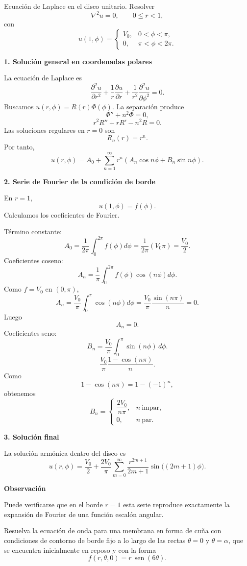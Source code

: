 \documentclass[11pt,spanish]{article}
\newcounter{problema}
\newcommand{\prob}{\stepcounter{problema} \vspace{.5cm} \noindent{\bf Problema \arabic{problema}: }}
\begin{document}
Ecuación de Laplace en el disco unitario.
Resolver
$$
\nabla^2u=0,
\qquad 0\le r<1,
$$
con
$$
u(1,\phi)=
\begin{cases}
V_0,&0<\phi<\pi,\\
0,&\pi<\phi<2\pi.
\end{cases}
$$

{\bf 1. Solución general en coordenadas polares}

La ecuación de Laplace es
$$
\frac{\partial^2u}{\partial r^2}
+\frac1r\frac{\partial u}{\partial r}
+\frac1{r^2}\frac{\partial^2u}{\partial\phi^2}=0.
$$
Buscamos $u(r,\phi)=R(r)\Phi(\phi)$.
La separación produce
$$
\Phi''+n^2\Phi=0,
$$
$$
r^2R''+rR'-n^2R=0.
$$
Las soluciones regulares en $r=0$ son
$$
R_n(r)=r^n.
$$
Por tanto,
$$
u(r,\phi)
=
A_0
+\sum_{n=1}^{\infty}
r^n
\left(
A_n\cos n\phi
+
B_n\sin n\phi
\right).
$$

{\bf 2. Serie de Fourier de la condición de borde}

En $r=1$,
$$
u(1,\phi)=f(\phi).
$$
Calculamos los coeficientes de Fourier.

Término constante:
$$
A_0
=
\frac1{2\pi}
\int_0^{2\pi}f(\phi)d\phi
=
\frac1{2\pi}(V_0\pi)
=
\frac{V_0}{2}.
$$
Coeficientes coseno:
$$
A_n
=
\frac1\pi
\int_0^{2\pi}
f(\phi)\cos(n\phi)d\phi.
$$
Como $f=V_0$ en $(0,\pi)$,
$$
A_n
=
\frac{V_0}{\pi}
\int_0^\pi \cos(n\phi)d\phi
=
\frac{V_0}{\pi}
\frac{\sin(n\pi)}{n}
=
0.
$$
Luego
$$
\boxed{A_n=0.}
$$
Coeficientes seno:
$$
B_n
=
\frac{V_0}{\pi}
\int_0^\pi
\sin(n\phi)\,d\phi.
$$
$$
\frac{V_0}{\pi}
\frac{1-\cos(n\pi)}{n}.
$$
Como
$$
1-\cos(n\pi)
=
1-(-1)^n,
$$
obtenemos
$$
B_n=
\begin{cases}
\dfrac{2V_0}{n\pi},&n\ \text{impar},\\
0,&n\ \text{par}.
\end{cases}
$$

{\bf 3. Solución final}

La solución armónica dentro del disco es
$$
\boxed{
u(r,\phi)
=
\frac{V_0}{2}
+
\frac{2V_0}{\pi}
\sum_{m=0}^{\infty}
\frac{r^{2m+1}}{2m+1}
\sin\big((2m+1)\phi\big).
}
$$

{\bf Observación}

Puede verificarse que en el borde $r=1$ esta serie reproduce exactamente la expansión de Fourier de una función escalón angular.



\prob Resuelva la ecuación de onda para una membrana en forma de cuña con condiciones de contorno de borde fijo a lo largo de las rectas $\theta = 0$ y $\theta = \alpha$, que se encuentra inicialmente en reposo y con la forma
\[
f(r,\theta,0) = r\,\operatorname{sen}(6\theta).
\]
\end{document}
